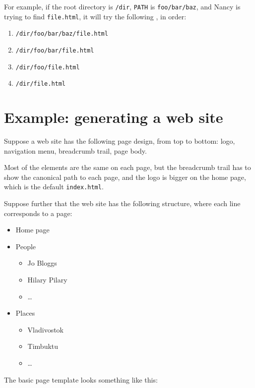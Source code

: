 \documentclass[a4paper,english]{scrartcl}
\begin{document}
For example, if the root directory is \verb|/dir|, \verb|PATH| is \verb|foo/bar/baz|, and Nancy is trying to find \verb|file.html|, it will try the following , in order:

\begin{enumerate}
\item \verb|/dir/foo/bar/baz/file.html|
\item \verb|/dir/foo/bar/file.html|
\item \verb|/dir/foo/file.html|
\item \verb|/dir/file.html|
\end{enumerate}

\section{Example: generating a web site}

Suppose a web site has the following page design, from top to bottom: logo, navigation menu, breadcrumb trail, page body.

Most of the elements are the same on each page, but the breadcrumb trail has to show the canonical path to each page, and the logo is bigger on the home page, which is the default \verb|index.html|.

Suppose further that the web site has the following structure, where each line corresponds to a page:

\begin{itemize}
\item Home page
\item People
  \begin{itemize}
  \item Jo Bloggs
  \item Hilary Pilary
  \item \dots
  \end{itemize}
\item Places
  \begin{itemize}
  \item Vladivostok
  \item Timbuktu
  \item \dots
  \end{itemize}
\end{itemize}

The basic page template looks something like this:
\end{document}
